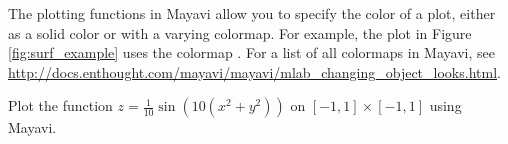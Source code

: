 The plotting functions in Mayavi allow you to specify the color of a plot, either as a solid color or with a varying colormap.
For example, the plot in Figure \ref{fig:surf_example} uses the colormap .
For a list of all colormaps in Mayavi, see \url{http://docs.enthought.com/mayavi/mayavi/mlab_changing_object_looks.html}.

\begin{problem}
Plot the function $z = \frac{1}{10}\sin(10(x^2+y^2))$ on $[-1,1] \times [-1,1]$ using Mayavi.
\end{problem}

